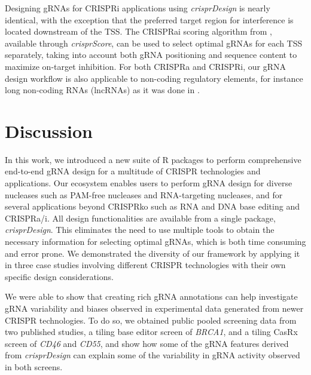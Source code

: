 \documentclass[pdftex,english,10pt]{article}
\begin{document}
Designing gRNAs for CRISPRi applications using \textit{crisprDesign} is nearly identical, with the exception that the preferred target region for interference is located downstream of the TSS. The CRISPRai scoring algorithm from \citet{crispria}, available through \textit{crisprScore}, can be used to select optimal gRNAs for each TSS separately, taking into account both gRNA positioning and sequence content to maximize on-target inhibition. For both CRISPRa and CRISPRi, our gRNA design workflow is also applicable to non-coding regulatory elements, for instance long non-coding RNAs (lncRNAs) as it was done in \citet{liu2017crispri}.





\section{Discussion}


In this work, we introduced a new suite of R packages to perform comprehensive end-to-end gRNA design for a multitude of CRISPR technologies and applications. Our ecosystem enables users to perform gRNA design for diverse nucleases such as PAM-free nucleases and RNA-targeting nucleases, and for several applications beyond CRISPRko such as RNA and DNA base editing and CRISPRa/i. All design functionalities are available from a single package, \textit{crisprDesign}. This eliminates the need to use multiple tools to obtain the necessary information for selecting optimal gRNAs, which is both time consuming and error prone. We demonstrated the diversity of our framework by applying it in three case studies involving different CRISPR technologies with their own specific design considerations. 

We were able to show that creating rich gRNA annotations can help investigate gRNA variability and biases observed in experimental data generated from newer CRISPR technologies. To do so, we obtained public pooled screening data from two published studies, a tiling base editor screen of \textit{BRCA1}, and a tiling CasRx screen of \textit{CD46} and \textit{CD55}, and show how some of the gRNA features derived from \textit{crisprDesign} can explain some of the variability in gRNA activity observed in both screens. 
\end{document}
